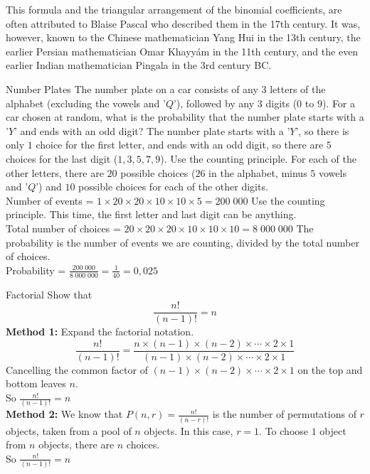 {This formula and the triangular arrangement of the binomial coefficients, are often attributed to Blaise Pascal who described them in the 17th century. It was, however, known to the Chinese mathematician Yang Hui in the 13th century, the earlier Persian mathematician Omar Khayyám in the 11th century, and the even earlier Indian mathematician Pingala in the 3rd century BC.

}

\begin{wex}{Number Plates}
{The number plate on a car consists of any $3$ letters of the alphabet (excluding the vowels and '$Q$'), followed by any $3$ digits ($0$ to $9$). For a car chosen at random, what is the probability that the number plate starts with a '$Y$' and ends with an odd digit?}
{
 The number plate starts with a '$Y$', so there is only $1$ choice for the first letter, and ends with an odd digit, so there are $5$ choices for the last digit ($1, 3, 5, 7, 9$).
Use the counting principle. For each of the other letters, there are $20$ possible choices ($26$ in the alphabet, minus $5$ vowels and '$Q$') and $10$ possible choices for each of the other digits.\\ Number of events = $1 \times 20 \times 20 \times 10 \times 10 \times 5 = 200\;000$
Use the counting principle. This time, the first letter and last digit can be anything.\\
Total number of choices = $20 \times 20 \times 20 \times 10 \times 10 \times 10 = 8\;000\;000$
 The probability is the number of events we are counting, divided by the total number of choices.\\
Probability = $\frac{200\;000}{8\;000\;000} = \frac{1}{40} = 0,025$
}
\end{wex}

\begin{wex}{Factorial}
{Show that $$\frac{n!}{(n-1)!} = n$$}
{
\textbf{Method 1:} Expand the factorial notation.
$$\frac{n!}{(n-1)!}  =  \frac{n \times (n-1) \times (n-2) \times \cdots \times 2 \times 1}{(n-1) \times (n-2) \times \cdots \times 2 \times 1}$$
Cancelling the common factor of $(n-1) \times (n-2) \times \cdots \times 2 \times 1$ on the top and bottom leaves $n$.\\
So $\frac{n!}{(n-1)!} = n$\\

\textbf{Method 2:}
We know that $P(n,r) = \frac{n!}{(n-r)!}$ is the number of permutations of $r$ objects, taken from a pool of $n$ objects. In this case, $r=1$. To choose $1$ object from $n$ objects, there are $n$ choices.\\
So $\frac{n!}{(n-1)!} = n$\\

}
\end{wex}

